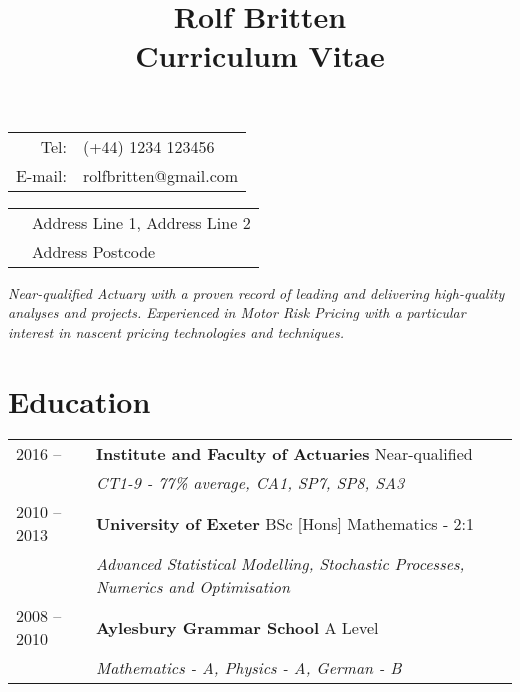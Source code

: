 \documentclass[11pt]{article}
\title{\bfseries \Huge Rolf Britten \\ \Large Curriculum Vitae}
\date{}
\begin{document}
\vspace{-20mm}
\maketitle
\vspace{-20mm}
\begin{minipage}[ht]{0.48\textwidth}
\begin{tabular}{r l}
Tel: & (+44) 1234 123456\\
E-mail: & rolfbritten@gmail.com\\
\end{tabular}
\end{minipage}
\begin{minipage}[ht]{0.48\textwidth}
\begin{tabular}{l l}
& Address Line 1, Address Line 2\\
& Address Postcode\
\end{tabular}
\end{minipage}

\begin{center} \emph{ Near-qualified Actuary with a proven record of leading and delivering high-quality analyses and projects. Experienced in Motor Risk Pricing with a particular interest in nascent pricing technologies and techniques.} \end{center}

\section*{Education}
\begin{tabular}{l | l l}
2016 --  & \textbf{Institute and Faculty of Actuaries} Near-qualified \\
& \hspace{4mm} \textit{CT1-9 - 77\% average, CA1, SP7, SP8, SA3} \\
2010 -- 2013 & \textbf{University of Exeter} BSc [Hons] Mathematics - 2:1\\
& \hspace{4mm} \textit{Advanced Statistical Modelling, Stochastic Processes, Numerics and Optimisation }\\
2008 -- 2010 & \textbf{Aylesbury Grammar School} A Level \\
& \hspace{4mm} \textit{Mathematics - A, Physics - A, German - B} \\
\end{tabular}
\end{document}
